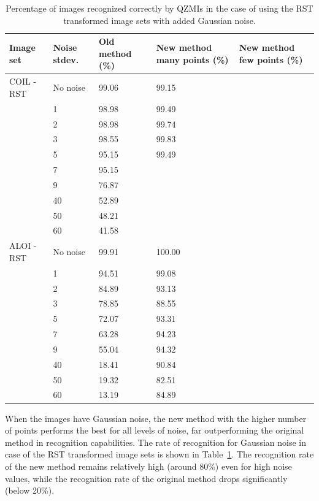 \begin{table}[tbp]
    \centering
    \begin{tabular}{|p{2.15cm}|p{1.8cm}|p{3cm}|p{2.74cm}|p{2.6cm}|} \hline
        \textbf{Image set} & \textbf{Noise stdev.} & \textbf{Old method} (\%) & \textbf{New method} many points (\%)& \textbf{New method} few points (\%) \\ \hline\hline
        COIL - RST & No noise & 99.06 & 99.15 &  \\ \cline{2-5}
        & 1 & 98.98 & 99.49 &  \\ \cline{2-5}
        & 2 & 98.98 & 99.74 &  \\ \cline{2-5}
        & 3 & 98.55 & 99.83 &  \\ \cline{2-5}
        & 5 & 95.15 & 99.49 &  \\ \cline{2-5}
        & 7 & 95.15 &  &  \\ \cline{2-5}
        & 9 & 76.87 &  &  \\ \cline{2-5}
        & 40 & 52.89 &  &  \\ \cline{2-5}
        & 50 & 48.21 &  &  \\ \cline{2-5}
        & 60 & 41.58 &  &  \\ \cline{1-5}
        ALOI - RST & No noise & 99.91 & 100.00 &  \\ \cline{2-5}
        & 1 & 94.51 & 99.08 &  \\ \cline{2-5}
        & 2 & 84.89 & 93.13 &  \\ \cline{2-5}
        & 3 & 78.85 & 88.55 &  \\ \cline{2-5}
        & 5 & 72.07 & 93.31 &  \\ \cline{2-5}
        & 7 & 63.28 & 94.23 &  \\ \cline{2-5}
        & 9 & 55.04 & 94.32 &  \\ \cline{2-5}
        & 40 & 18.41 & 90.84 &  \\ \cline{2-5}
        & 50 & 19.32 & 82.51 &  \\ \cline{2-5}
        & 60 & 13.19 & 84.89 &  \\ \cline{1-5}
    \end{tabular}
    \caption{Percentage of images recognized correctly by QZMIs in the case of using the RST transformed image sets with added Gaussian noise.}
    \label{tab:recognition_gauss}
\end{table}
When the images have Gaussian noise, the new method with the higher number of points performs the best for all levels of noise, far outperforming the original method in recognition capabilities. 
The rate of recognition for Gaussian noise in case of the RST transformed image sets is shown in Table~\ref{tab:recognition_gauss}. The recognition rate of the new method remains relatively high (around 80\%) even for high noise values, while the recognition rate of the original method drops significantly (below 20\%).

